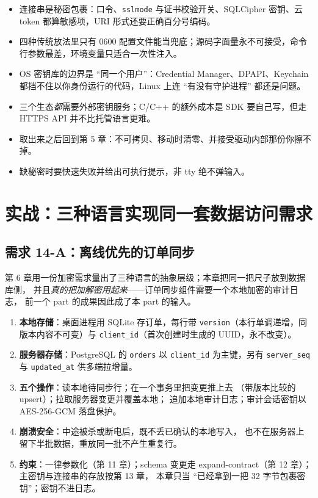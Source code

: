 \documentclass[12pt,a4paper,fontset=fandol]{ctexbook}
\newcommand{\Tp}[1]{\texttt{#1}}
\newcommand{\CppJava}{C/C++}
\begin{document}
\begin{guideline}[title=本章要点]
\begin{itemize}
  \item 连接串是秘密包裹：口令、\Tp{sslmode} 与证书校验开关、SQLCipher 密钥、云 token 都算敏感项，URI 形式还要正确百分号编码。
  \item 四种传统放法里只有 0600 配置文件能当兜底；源码字面量永不可接受，命令行参数最差，环境变量只适合一次性注入。
  \item OS 密钥库的边界是 ``同一个用户''：Credential Manager、DPAPI、Keychain 都挡不住以你身份运行的代码，Linux 上连 ``有没有守护进程'' 都还是问题。
  \item 三个生态\emph{都}需要外部密钥服务；\CppJava{} 的额外成本是 SDK 要自己写，但走 HTTPS API 并不比托管语言更难。
  \item 取出来之后回到第 5 章：不可拷贝、移动时清零、并接受驱动内部那份你擦不掉。
  \item 缺秘密时要快速失败并给出可执行提示，非 tty 绝不弹输入。
\end{itemize}
\end{guideline}

\chapter{实战：三种语言实现同一套数据访问需求}

\section{需求 14-A：离线优先的订单同步}

第 6 章用一份加密需求量出了三种语言的抽象层级；本章把同一把尺子放到数据库侧，
并且\emph{真的把加解密用起来}——订单同步组件需要一个本地加密的审计日志，
前一个 part 的成果因此成了本 part 的输入。

\begin{guideline}[title=需求 14-A]
\begin{enumerate}
  \item \textbf{本地存储}：桌面进程用 SQLite 存订单，每行带
        \Tp{version}（本行单调递增，同版本内容不可变）与
        \Tp{client\_id}（首次创建时生成的 UUID，永不改变）。
  \item \textbf{服务器存储}：PostgreSQL 的 \Tp{orders} 以 \Tp{client\_id}
        为主键，另有 \Tp{server\_seq} 与 \Tp{updated\_at} 供多端拉增量。
  \item \textbf{五个操作}：读本地待同步行；在一个事务里把变更推上去
        （带版本比较的 upsert）；拉取服务器变更并覆盖本地；
        追加本地审计日志；审计会话密钥以 AES-256-GCM 落盘保护。
  \item \textbf{崩溃安全}：中途被杀或断电后，既不丢已确认的本地写入，
        也不在服务器上留下半批数据，重放同一批不产生重复行。
  \item \textbf{约束}：一律参数化（第 11 章）；schema 变更走
        expand-contract（第 12 章）；主密钥与连接串的存放按第 13 章，
        本章只当 ``已经拿到一把 32 字节包裹密钥''；密钥不进日志。
\end{enumerate}
\end{guideline}
\end{document}
